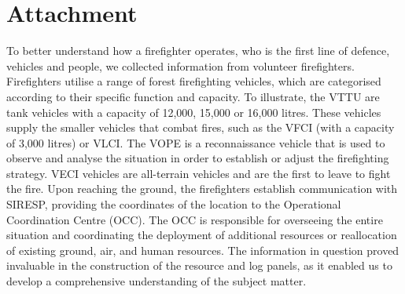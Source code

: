 \section{Attachment}
To better understand how a firefighter operates, who is the first line of defence, vehicles and people, we collected information from volunteer firefighters.
Firefighters utilise a range of forest firefighting vehicles, which are categorised according to their specific function and capacity. To illustrate, the VTTU are tank vehicles with a capacity of 12,000, 15,000 or 16,000 litres. These vehicles supply the smaller vehicles that combat fires, such as the VFCI (with a capacity of 3,000 litres) or VLCI. The VOPE is a reconnaissance vehicle that is used to observe and analyse the situation in order to establish or adjust the firefighting strategy. VECI vehicles are all-terrain vehicles and are the first to leave to fight the fire.
Upon reaching the ground, the firefighters establish communication with SIRESP, providing the coordinates of the location to the Operational Coordination Centre (OCC). The OCC is responsible for overseeing the entire situation and coordinating the deployment of additional resources or reallocation of existing ground, air, and human resources.
The information in question proved invaluable in the construction of the resource and log panels, as it enabled us to develop a comprehensive understanding of the subject matter.
